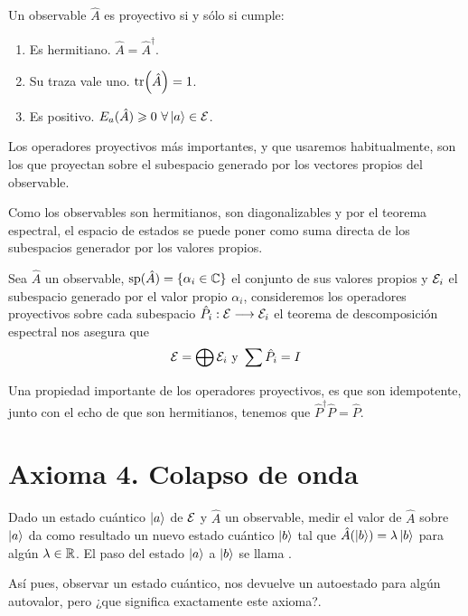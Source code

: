 \begin{proposition}
	Un observable $\hat{A}$ es proyectivo si y sólo si cumple:
	\begin{enumerate}
		\item Es hermitiano. $\hat{A}=\hat{A}^\dagger$.
		\item Su traza vale uno. $\tr(\hat{A})=1$.
		\item Es positivo. $E_a(\hat{A})\geqslant 0\ \forall\ket{a}\in\E$.
	\end{enumerate}
\end{proposition}

Los operadores proyectivos más importantes, y que usaremos habitualmente, son los que proyectan sobre el subespacio generado por los vectores propios del observable.

Como los observables son hermitianos, son diagonalizables y por el teorema espectral, el espacio de estados se puede poner como suma directa de los subespacios generador por los valores propios.

Sea $\hat{A}$ un observable, $\text{sp}(\hat{A})=\qty{\alpha_i \in\mathbb{C}}$ el conjunto de sus valores propios y $\mathcal{E}_i$ el subespacio generado por el valor propio $\alpha_i$, consideremos los operadores proyectivos sobre cada subespacio $\hat{P}_i:\mathcal{E}\longrightarrow \mathcal{E}_i$ el teorema de descomposición espectral nos asegura que
\begin{equation}
	\label{eq:suma_directa_subespacios_estados}
	\mathcal{E}=\bigoplus\mathcal{E}_i\text{ y }\sum\hat{P}_i=I
\end{equation}

Una propiedad importante de los operadores proyectivos, es que son idempotente, junto con el echo de que son hermitianos, tenemos que $\hat{P}^\dagger\hat{P}=\hat{P}$.

\section{Axioma 4. Colapso de onda}\label{sec:axioma-4.-colapso-de-onda}
\begin{definition}[Axioma 4]
	Dado un estado cuántico $\ket{a}$ de $\mathcal{E}$ y $\hat{A}$ un observable, medir el valor de $\hat{A}$ sobre $\ket{a}$ da como resultado un nuevo estado cuántico $\ket{b}$ tal que $\hat{A}(\ket{b})=\lambda\ket{b}$ para algún $\lambda\in\mathbb{R}$.
	El paso del estado $\ket{a}$ a $\ket{b}$ se llama .
\end{definition}
Así pues, observar un estado cuántico, nos devuelve un autoestado para algún autovalor, pero ¿que significa exactamente este axioma?.

